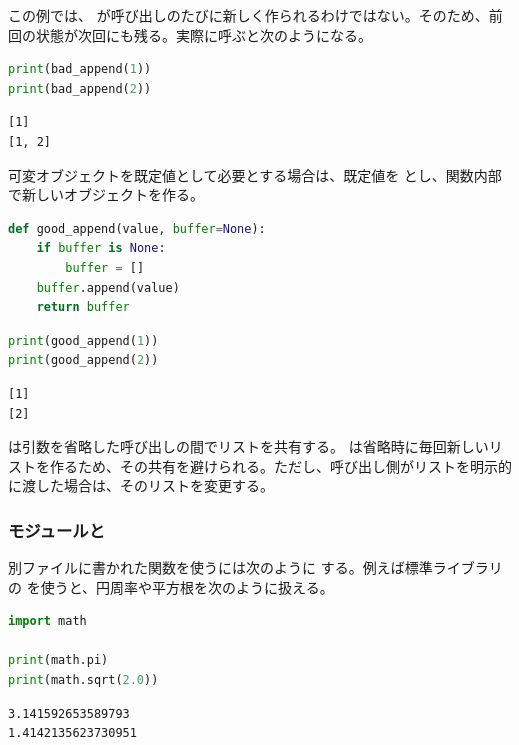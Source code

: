 この例では、 が呼び出しのたびに新しく作られるわけではない。そのため、前回の状態が次回にも残る。実際に呼ぶと次のようになる。

\begin{lstlisting}[language=Python]
print(bad_append(1))
print(bad_append(2))
\end{lstlisting}

\begin{lstlisting}[numbers=none, xleftmargin=2\zw]
[1]
[1, 2]
\end{lstlisting}

可変オブジェクトを既定値として必要とする場合は、既定値を  とし、関数内部で新しいオブジェクトを作る。

\begin{lstlisting}[language=Python]
def good_append(value, buffer=None):
    if buffer is None:
        buffer = []
    buffer.append(value)
    return buffer
\end{lstlisting}

\begin{lstlisting}[language=Python]
print(good_append(1))
print(good_append(2))
\end{lstlisting}

\begin{lstlisting}[numbers=none, xleftmargin=2\zw]
[1]
[2]
\end{lstlisting}

 は引数を省略した呼び出しの間でリストを共有する。 は省略時に毎回新しいリストを作るため、その共有を避けられる。ただし、呼び出し側がリストを明示的に渡した場合は、そのリストを変更する。

\subsubsection{モジュールと }

別ファイルに書かれた関数を使うには次のように  する。例えば標準ライブラリの  を使うと、円周率や平方根を次のように扱える。

\begin{lstlisting}[language=Python]
import math

print(math.pi)
print(math.sqrt(2.0))
\end{lstlisting}

\begin{lstlisting}[numbers=none, xleftmargin=2\zw]
3.141592653589793
1.4142135623730951
\end{lstlisting}

